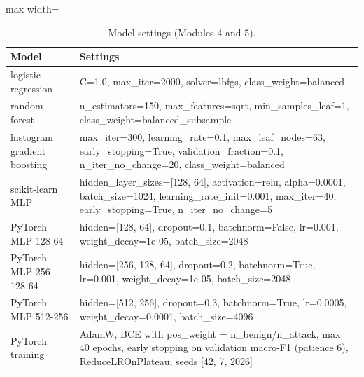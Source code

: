 \begin{table}[t]
\centering
\caption{Model settings (Modules 4 and 5).}
\label{tab:hyperparameters}
\scriptsize
\setlength{\tabcolsep}{3.5pt}
\begin{adjustbox}{max width=\linewidth}
\begin{tabular}{l>{\raggedright\arraybackslash}p{}}
\toprule
Model & Settings \\
\midrule
logistic regression & C=1.0, max\_iter=2000, solver=lbfgs, class\_weight=balanced \\
random forest & n\_estimators=150, max\_features=sqrt, min\_samples\_leaf=1, class\_weight=balanced\_subsample \\
histogram gradient boosting & max\_iter=300, learning\_rate=0.1, max\_leaf\_nodes=63, early\_stopping=True, validation\_fraction=0.1, n\_iter\_no\_change=20, class\_weight=balanced \\
scikit-learn MLP & hidden\_layer\_sizes=[128, 64], activation=relu, alpha=0.0001, batch\_size=1024, learning\_rate\_init=0.001, max\_iter=40, early\_stopping=True, n\_iter\_no\_change=5 \\
PyTorch MLP 128-64 & hidden=[128, 64], dropout=0.1, batchnorm=False, lr=0.001, weight\_decay=1e-05, batch\_size=2048 \\
PyTorch MLP 256-128-64 & hidden=[256, 128, 64], dropout=0.2, batchnorm=True, lr=0.001, weight\_decay=1e-05, batch\_size=2048 \\
PyTorch MLP 512-256 & hidden=[512, 256], dropout=0.3, batchnorm=True, lr=0.0005, weight\_decay=0.0001, batch\_size=4096 \\
PyTorch training & AdamW, BCE with pos\_weight = n\_benign/n\_attack, max 40 epochs, early stopping on validation macro-F1 (patience 6), ReduceLROnPlateau, seeds [42, 7, 2026] \\
\bottomrule
\end{tabular}
\end{adjustbox}
\end{table}
